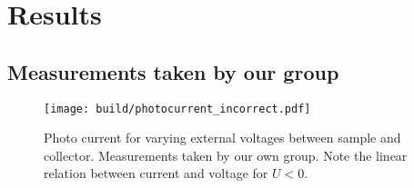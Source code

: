 \section{Results}
\label{sec:results}

\subsection{Measurements taken by our group}

\begin{figure*}
  \centering
  \texttt{[image: build/photocurrent\_incorrect.pdf]}
  \caption{Photo current for varying external voltages between sample and collector. Measurements taken by our own group. Note the linear relation between current and voltage for $U<0$.}
  \label{fig:photocurrent_own}
\end{figure*}
